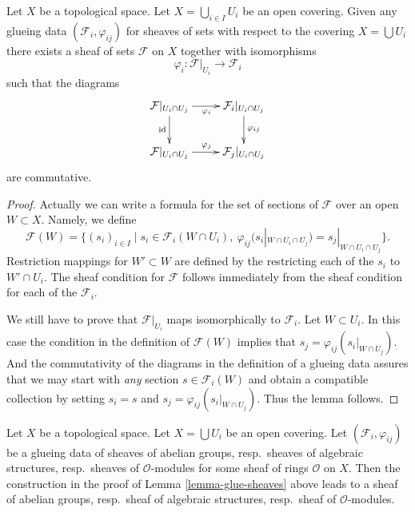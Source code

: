\begin{lemma}
\label{lemma-glue-sheaves}
Let $X$ be a topological space.
Let $X = \bigcup_{i\in I} U_i$ be an open covering.
Given any glueing data $(\mathcal{F}_i, \varphi_{ij})$
for sheaves of sets with respect to the covering $X = \bigcup U_i$
there exists a sheaf of sets $\mathcal{F}$ on $X$
together with isomorphisms
$$
\varphi_i : \mathcal{F}|_{U_i} \to \mathcal{F}_i
$$
such that the diagrams
$$
\xymatrix{
\mathcal{F}|_{U_i \cap U_j} \ar[r]_{\varphi_i} \ar[d]_{\text{id}} &
\mathcal{F}_i|_{U_i \cap U_j} \ar[d]^{\varphi_{ij}} \\
\mathcal{F}|_{U_i \cap U_j} \ar[r]^{\varphi_j} &
\mathcal{F}_j|_{U_i \cap U_j}
}
$$
are commutative.
\end{lemma}

\begin{proof}
Actually we can write a formula for the set of sections
of $\mathcal{F}$ over an open $W \subset X$. Namely, we define
$$
\mathcal{F}(W) = 
\{
(s_i)_{i \in I} \mid
s_i \in \mathcal{F}_i(W \cap U_i),\ 
\varphi_{ij}(s_i|_{W \cap U_i \cap U_j}) = s_j|_{W \cap U_i \cap U_j}
\}.
$$
Restriction mappings for $W' \subset W$ are defined by the restricting
each of the $s_i$ to $W' \cap U_i$. The sheaf condition for $\mathcal{F}$
follows immediately from the sheaf condition for each of the
$\mathcal{F}_i$. 

\medskip\noindent
We still have to prove that $\mathcal{F}|_{U_i}$ maps
isomorphically to $\mathcal{F}_i$. Let $W \subset U_i$.
In this case the condition in the definition of 
$\mathcal{F}(W)$ implies that $s_j = \varphi_{ij}(s_i|_{W \cap U_j})$.
And the commutativity of the diagrams in the definition
of a glueing data assures that we may start with {\it any}
section $s \in \mathcal{F}_i(W)$ and obtain a compatible
collection by setting $s_i = s$ and $s_j = \varphi_{ij}(s_i|_{W \cap U_j})$.
Thus the lemma follows.
\end{proof}

\begin{lemma}
\label{lemma-glue-sheaves-structures}
Let $X$ be a topological space.
Let $X = \bigcup U_i$ be an open covering.
Let $(\mathcal{F}_i, \varphi_{ij})$ be a glueing data
of sheaves of abelian groups, resp.\ sheaves of algebraic structures,
resp.\ sheaves of $\mathcal{O}$-modules for some sheaf of rings
$\mathcal{O}$ on $X$. Then the construction in the proof of
Lemma \ref{lemma-glue-sheaves} above leads to a sheaf
of abelian groups, resp.\ sheaf of algebraic structures,
resp.\ sheaf of $\mathcal{O}$-modules.
\end{lemma}

